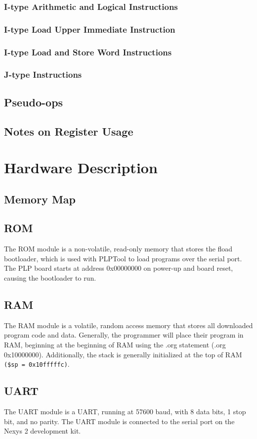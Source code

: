 \documentclass{article}
\begin{document}
\subsubsection{I-type Arithmetic and Logical Instructions}
\subsubsection{I-type Load Upper Immediate Instruction}
\subsubsection{I-type Load and Store Word Instructions}
\subsubsection{J-type Instructions}
\subsection{Pseudo-ops}
\subsection{Notes on Register Usage}
\section{Hardware Description}
\subsection{Memory Map}
\subsection{ROM}
The ROM module is a non-volatile, read-only memory that stores the fload bootloader, which is used with PLPTool to load programs over the serial port. The PLP board starts at address 0x00000000 on power-up and board reset, causing the bootloader to run. 
\subsection{RAM}
The RAM module is a volatile, random access memory that stores all downloaded program code and data. Generally, the programmer will place their program in RAM, beginning at the beginning of RAM using the .org statement (.org 0x10000000). Additionally, the stack is generally initialized at the top of RAM \verb+($sp = 0x10fffffc)+.
\subsection{UART}
The UART module is a UART, running at 57600 baud, with 8 data bits, 1 stop bit, and no parity. The UART module is connected to the serial port on the Nexys 2 development kit.
\end{document}

